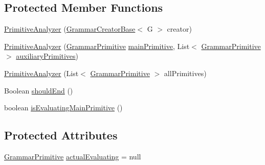 \subsection*{Protected Member Functions}
\begin{DoxyCompactItemize}
\item 
\hyperlink{classit_1_1emarolab_1_1cagg_1_1core_1_1evaluation_1_1semanticGrammar_1_1syntaxCompiler_1_1Gramma476c64fc54be5b96aaf6048986cec760_a6034d2afe7d7a1038bffd979164a47c1}{Primitive\-Analyzer} (\hyperlink{classit_1_1emarolab_1_1cagg_1_1core_1_1evaluation_1_1semanticGrammar_1_1syntaxCompiler_1_1Gramma1bf252c3f4def91ad707660fdfe73d0a_ae70c5f17b10ebb0594f80fe73d6b40fe}{Grammar\-Creator\-Base}$<$ G $>$ creator)
\item 
\hyperlink{classit_1_1emarolab_1_1cagg_1_1core_1_1evaluation_1_1semanticGrammar_1_1syntaxCompiler_1_1Gramma476c64fc54be5b96aaf6048986cec760_a6bda0b8f372514177982f97d9be49821}{Primitive\-Analyzer} (\hyperlink{classit_1_1emarolab_1_1cagg_1_1core_1_1language_1_1syntax_1_1GrammarPrimitive}{Grammar\-Primitive} \hyperlink{classit_1_1emarolab_1_1cagg_1_1core_1_1evaluation_1_1semanticGrammar_1_1syntaxCompiler_1_1Gramma476c64fc54be5b96aaf6048986cec760_a1e49a575da03e6301db21581a30f2367}{main\-Primitive}, List$<$ \hyperlink{classit_1_1emarolab_1_1cagg_1_1core_1_1language_1_1syntax_1_1GrammarPrimitive}{Grammar\-Primitive} $>$ \hyperlink{classit_1_1emarolab_1_1cagg_1_1core_1_1evaluation_1_1semanticGrammar_1_1syntaxCompiler_1_1Gramma476c64fc54be5b96aaf6048986cec760_a84107aca0e6240655ba4f86b7ed1a60b}{auxiliary\-Primitives})
\item 
\hyperlink{classit_1_1emarolab_1_1cagg_1_1core_1_1evaluation_1_1semanticGrammar_1_1syntaxCompiler_1_1Gramma476c64fc54be5b96aaf6048986cec760_ac90bce2300871ae3d1c48a6da84fafdb}{Primitive\-Analyzer} (List$<$ \hyperlink{classit_1_1emarolab_1_1cagg_1_1core_1_1language_1_1syntax_1_1GrammarPrimitive}{Grammar\-Primitive} $>$ all\-Primitives)
\item 
Boolean \hyperlink{classit_1_1emarolab_1_1cagg_1_1core_1_1evaluation_1_1semanticGrammar_1_1syntaxCompiler_1_1Gramma476c64fc54be5b96aaf6048986cec760_a9e1288c3ad9d1804bf859c9139be7b75}{should\-End} ()
\item 
boolean \hyperlink{classit_1_1emarolab_1_1cagg_1_1core_1_1evaluation_1_1semanticGrammar_1_1syntaxCompiler_1_1Gramma476c64fc54be5b96aaf6048986cec760_a40e1933ee780f5ebcb77e6b3b14c1854}{is\-Evaluating\-Main\-Primitive} ()
\end{DoxyCompactItemize}
\subsection*{Protected Attributes}
\begin{DoxyCompactItemize}
\item 
\hyperlink{classit_1_1emarolab_1_1cagg_1_1core_1_1language_1_1syntax_1_1GrammarPrimitive}{Grammar\-Primitive} \hyperlink{classit_1_1emarolab_1_1cagg_1_1core_1_1evaluation_1_1semanticGrammar_1_1syntaxCompiler_1_1Gramma476c64fc54be5b96aaf6048986cec760_a399cdcbebad26b36b4ea35f7b0b77fc2}{actual\-Evaluating} = null
\end{DoxyCompactItemize}
